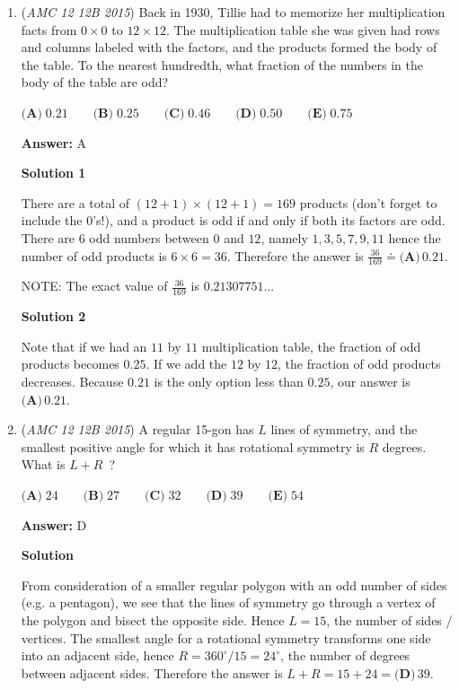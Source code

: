 \begin{enumerate}
 
 \[\frac{1+N}{3+N}=\frac{95}{100}=\frac{19}{20}\]

 Cross-multiplying yields $20(1+N)=19(3+N)$, and we find that $N=\fbox{\textbf{(B)}\; 37}$.

 


	\item (\textit{AMC 12 12B 2015}) Back in 1930, Tillie had to memorize her multiplication facts from $0 \times 0$ to $12 \times 12$. The multiplication table she was given had rows and columns labeled with the factors, and the products formed the body of the table. To the nearest hundredth, what fraction of the numbers in the body of the table are odd?


 $\textbf{(A)}\; 0.21 \qquad\textbf{(B)}\; 0.25 \qquad\textbf{(C)}\; 0.46 \qquad\textbf{(D)}\; 0.50 \qquad\textbf{(E)}\; 0.75$

 \textbf{Answer: }A



\textbf{Solution 1}

There are a total of $(12+1) \times (12+1) = 169$ products (don't forget to include the 0's!), and a product is odd if and only if both its factors are odd. There are $6$ odd numbers between $0$ and $12$, namely $1, 3, 5, 7, 9, 11$ hence the number of odd products is $6 \times 6 = 36$. Therefore the answer is $\frac{36}{169} \doteq \boxed{\textbf{(A)} \, 0.21}$.

 NOTE: The exact value of $\frac{36}{169}$ is $0.21307751...$




\textbf{Solution 2}

Note that if we had an $11$ by $11$ multiplication table, the fraction of odd products becomes $0.25$. If we add the $12$ by $12$, the fraction of odd products decreases. Because $0.21$ is the only option less than $0.25$, our answer is $\boxed{\textbf{(A)} \, 0.21}$.

 


	\item (\textit{AMC 12 12B 2015}) A regular 15-gon has $L$ lines of symmetry, and the smallest positive angle for which it has rotational symmetry is $R$ degrees. What is $L+R$ ?


 $\textbf{(A)}\; 24 \qquad\textbf{(B)}\; 27 \qquad\textbf{(C)}\; 32 \qquad\textbf{(D)}\; 39 \qquad\textbf{(E)}\; 54$

 \textbf{Answer: }D



\textbf{Solution}

From consideration of a smaller regular polygon with an odd number of sides (e.g. a pentagon), we see that the lines of symmetry go through a vertex of the polygon and bisect the opposite side. Hence $L=15$, the number of sides / vertices. The smallest angle for a rotational symmetry transforms one side into an adjacent side, hence $R = 360^\circ / 15 = 24^\circ$, the number of degrees between adjacent sides. Therefore the answer is $L + R = 15 + 24 = \boxed{\textbf{(D)} \, 39}$.


\end{enumerate}
